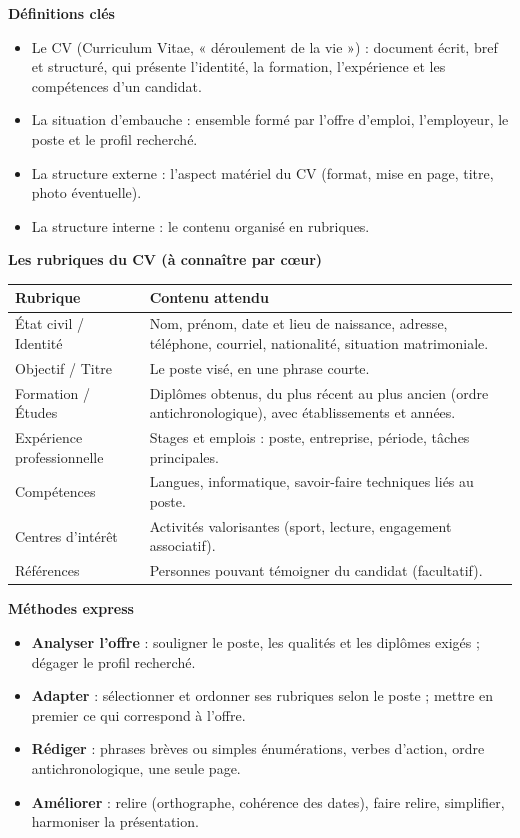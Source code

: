 \documentclass[11pt]{article}
\newcommand{\cle}[1]{{\popxbold\color{popdark}#1}}
\begin{document}
\begin{bilan}
\textbf{Définitions clés}
\begin{itemize}
  \item Le \cle{CV} (Curriculum Vitae, « déroulement de la vie ») : document écrit, bref et structuré, qui présente l'identité, la formation, l'expérience et les compétences d'un candidat.
  \item La \cle{situation d'embauche} : ensemble formé par l'offre d'emploi, l'employeur, le poste et le profil recherché.
  \item La \cle{structure externe} : l'aspect matériel du CV (format, mise en page, titre, photo éventuelle).
  \item La \cle{structure interne} : le contenu organisé en rubriques.
\end{itemize}

\textbf{Les rubriques du CV (à connaître par cœur)}
\begin{center}
\begin{tabularx}{\linewidth}{|l|X|}
\hline
\rowcolor{popblueL} \textbf{Rubrique} & \textbf{Contenu attendu} \\
\hline
État civil / Identité & Nom, prénom, date et lieu de naissance, adresse, téléphone, courriel, nationalité, situation matrimoniale. \\
\hline
Objectif / Titre & Le poste visé, en une phrase courte. \\
\hline
Formation / Études & Diplômes obtenus, du plus récent au plus ancien (ordre antichronologique), avec établissements et années. \\
\hline
Expérience professionnelle & Stages et emplois : poste, entreprise, période, tâches principales. \\
\hline
Compétences & Langues, informatique, savoir-faire techniques liés au poste. \\
\hline
Centres d'intérêt & Activités valorisantes (sport, lecture, engagement associatif). \\
\hline
Références & Personnes pouvant témoigner du candidat (facultatif). \\
\hline
\end{tabularx}
\end{center}

\textbf{Méthodes express}
\begin{itemize}
  \item \textbf{Analyser l'offre} : souligner le poste, les qualités et les diplômes exigés ; dégager le profil recherché.
  \item \textbf{Adapter} : sélectionner et ordonner ses rubriques selon le poste ; mettre en premier ce qui correspond à l'offre.
  \item \textbf{Rédiger} : phrases brèves ou simples énumérations, verbes d'action, ordre antichronologique, une seule page.
  \item \textbf{Améliorer} : relire (orthographe, cohérence des dates), faire relire, simplifier, harmoniser la présentation.
\end{itemize}
\end{bilan}
\end{document}
